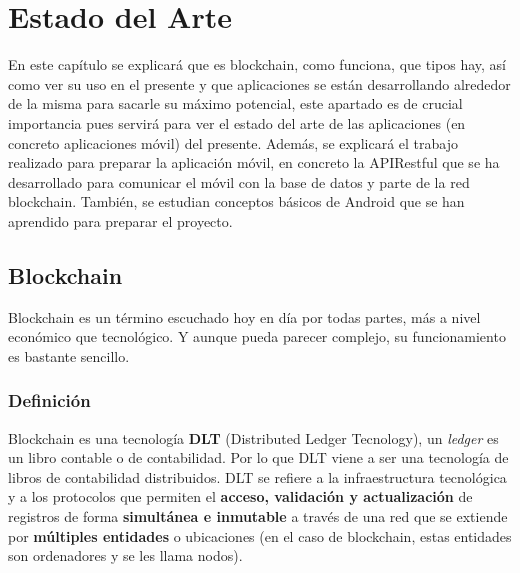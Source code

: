 \chapter{Estado del Arte}
\label{cap:EstadoArte}

\setlength{\parindent}{0pt}

En este capítulo se explicará que es blockchain, como funciona, que tipos hay, así como ver su uso en el presente y que aplicaciones se están desarrollando alrededor de la misma para sacarle su máximo potencial, este apartado es de crucial importancia pues servirá para ver el estado del arte de las aplicaciones (en concreto aplicaciones móvil) del presente. Además, se explicará el trabajo realizado para preparar la aplicación móvil, en concreto la APIRestful que se ha desarrollado para comunicar el móvil con la base de datos y parte de la red blockchain. También, se estudian conceptos básicos de Android que se han aprendido para preparar el proyecto. 

\section{Blockchain}
Blockchain\cite{b1,b2,b3,b4} es un término escuchado hoy en día por todas partes, más a nivel económico que tecnológico. Y aunque pueda parecer complejo, su funcionamiento es bastante sencillo.

\subsection{Definición}

Blockchain es una tecnología \textbf{DLT} (Distributed Ledger Tecnology), un \emph{ledger} es un libro contable o de contabilidad. Por lo que DLT viene a ser una tecnología de libros de contabilidad distribuidos. DLT se refiere a la infraestructura tecnológica y a los protocolos que permiten el \textbf{acceso, validación y actualización} de registros de forma \textbf{simultánea e inmutable} a través de una red que se extiende por \textbf{múltiples entidades} o ubicaciones (en el caso de blockchain, estas entidades son ordenadores y se les llama nodos). \\

